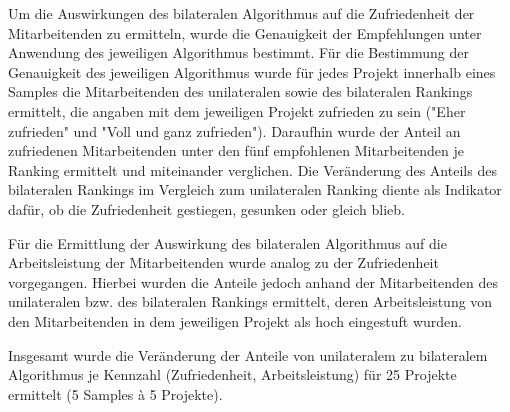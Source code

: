 Um die Auswirkungen des bilateralen Algorithmus auf die Zufriedenheit der Mitarbeitenden zu ermitteln, wurde die Genauigkeit der Empfehlungen unter Anwendung des jeweiligen Algorithmus bestimmt.
Für die Bestimmung der Genauigkeit des jeweiligen Algorithmus wurde für jedes Projekt innerhalb eines Samples die Mitarbeitenden des unilateralen sowie des bilateralen Rankings ermittelt, die angaben mit dem jeweiligen Projekt zufrieden zu sein ("Eher zufrieden" und "Voll und ganz zufrieden").
Daraufhin wurde der Anteil an zufriedenen Mitarbeitenden unter den fünf empfohlenen Mitarbeitenden je Ranking ermittelt und miteinander verglichen.
Die Veränderung des Anteils des bilateralen Rankings im Vergleich zum unilateralen Ranking diente als Indikator dafür, ob die Zufriedenheit gestiegen, gesunken oder gleich blieb.

Für die Ermittlung der Auswirkung des bilateralen Algorithmus auf die Arbeitsleistung der Mitarbeitenden wurde analog zu der Zufriedenheit vorgegangen.
Hierbei wurden die Anteile jedoch anhand der Mitarbeitenden des unilateralen bzw. des bilateralen Rankings ermittelt, deren Arbeitsleistung von den Mitarbeitenden in dem jeweiligen Projekt als hoch eingestuft wurden.

Insgesamt wurde die Veränderung der Anteile von unilateralem zu bilateralem Algorithmus je Kennzahl (Zufriedenheit, Arbeitsleistung) für 25 Projekte ermittelt (5 Samples \`{a} 5 Projekte).


